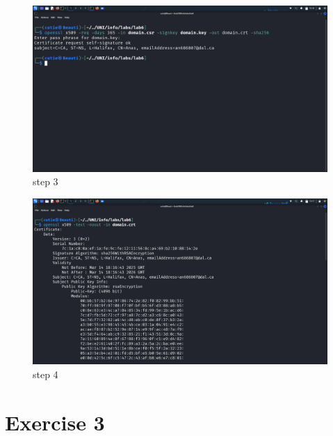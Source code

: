 \documentclass{article}
\numberwithin{equation}{subsection}
\begin{document}
\begin{center}
	\begin{figure}[H]
		\includegraphics[width=400pt]{pic/2.3.png}
		\caption{step 3}
	\end{figure}


	\begin{figure}[H]
		\includegraphics[width=400pt]{pic/2.4.png}
		\caption{step 4}
	\end{figure}
	\end{center}
	\newpage
	\section{Exercise 3}
	
\end{document}
